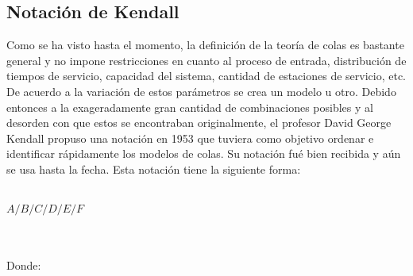 \documentclass{article}
\begin{document}
\subsection{Notación de Kendall}
Como se ha visto
hasta el momento, la definición de la teoría de colas es bastante general y 
no impone restricciones en cuanto al proceso de entrada, distribución de tiempos
de servicio, capacidad del sistema, cantidad de estaciones de servicio, etc. 
De acuerdo a la variación de estos parámetros se crea un modelo u otro. Debido 
entonces a la exageradamente gran cantidad de combinaciones posibles y al 
desorden con que estos se encontraban originalmente, el profesor David George Kendall
propuso una notación en 1953 que tuviera como objetivo ordenar e identificar rápidamente 
los modelos de colas. Su notación fué bien recibida y aún se usa hasta la fecha.
Esta notación tiene la siguiente forma: \\\\
\begin{Large} $ A/B/C/D/E/F $ \end{Large} \\\\
Donde:
\end{document}
